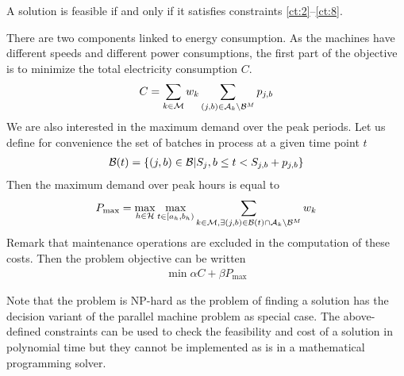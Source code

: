 A solution is feasible if and only if it satisfies constraints
\ref{ct:2}--\ref{ct:8}.


There are two components linked to energy consumption. As the machines
have different speeds and different power consumptions, the first part
of the objective is to minimize the total electricity consumption $C$.
\begin{eqnarray}
C=\sum_{k\in{\cal M}} w_k\sum_{(j,b)\in{\cal A}_k\setminus{\cal
    B}^M}p_{j,b}\label{eq:obj2}
\end{eqnarray}
We are also interested in the maximum demand over the peak
periods. Let us define for convenience the set of batches in process
at a given time point $t$
\begin{eqnarray}
{\cal B}(t)=\{(j,b)\in{\cal B}|S_j,b\leq t <
S_{j,b}+p_{j,b}\}\label{eq:obj4}
\end{eqnarray}
Then the maximum demand over peak hours is equal to
\begin{eqnarray}
P_{\max}=\max_{h\in{\cal H}}\max_{t\in[a_h,b_h)}\sum_{k\in{\cal
      M},\exists(j,b)\in{\cal B}(t)\cap{\cal A}_k\setminus{\cal
      B}^M}w_k\label{eq:obj5}
\end{eqnarray}
Remark that maintenance operations are excluded in the computation of
these costs.  Then the problem objective can be written
\begin{eqnarray}
\min \alpha C + \beta P_{\max}\label{eq:obj}
\end{eqnarray}


Note that the problem is NP-hard as the problem of finding a solution
has the decision variant of the parallel machine problem as special
case.  The above-defined constraints can be used to check the
feasibility and cost of a solution in polynomial time but they cannot
be implemented as is in a mathematical programming solver.


